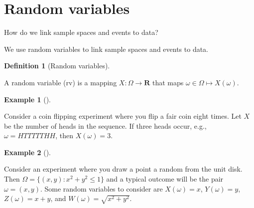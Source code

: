 \documentclass[
  a4paper,
  oneside]{book}
\theoremstyle{definition}
\newtheorem{definition}{Definition}[chapter]
\theoremstyle{definition}
\newtheorem{example}{Example}[chapter]
\theoremstyle{definition}
\theoremstyle{plain}
\theoremstyle{remark}
\begin{document}
\section*{Random variables}\label{random-variables}


\begin{tcolorbox}[enhanced jigsaw, colframe=quarto-callout-note-color-frame, breakable, toprule=.15mm, bottomrule=.15mm, title=\textcolor{quarto-callout-note-color}{\faInfo}\hspace{0.5em}{Note}, arc=.35mm, opacityback=0, left=2mm, opacitybacktitle=0.6, bottomtitle=1mm, toptitle=1mm, titlerule=0mm, rightrule=.15mm, colback=white, colbacktitle=quarto-callout-note-color!10!white, coltitle=black, leftrule=.75mm]

How do we link sample spaces and events to data?

\end{tcolorbox}

We use random variables to link sample spaces and events to data.

\begin{definition}[Random
variables]\protect\hypertarget{def-rv}{}\label{def-rv}

A random variable (rv) is a mapping \(X : \Omega \to \mathbf{R}\) that
maps \(\omega \in \Omega \mapsto X(\omega)\).

\end{definition}

\begin{example}[]\protect\hypertarget{exm-rv-1}{}\label{exm-rv-1}

Consider a coin flipping experiment where you flip a fair coin eight
times. Let \(X\) be the number of heads in the sequence. If three heads
occur, e.g., \(\omega = HTTTTTHH\), then \(X(\omega) = 3\).

\end{example}

\begin{example}[]\protect\hypertarget{exm-rv-2}{}\label{exm-rv-2}

Consider an experiment where you draw a point a random from the unit
disk. Then \(\Omega = \{(x,y) : x^2 + y^2 \leq 1\}\) and a typical
outcome will be the pair \(\omega = (x,y)\). Some random variables to
consider are \(X(\omega) = x\), \(Y(\omega) = y\), \(Z(\omega) = x+y\),
and \(W(\omega) = \sqrt{x^2 + y^2}\).

\end{example}
\end{document}
